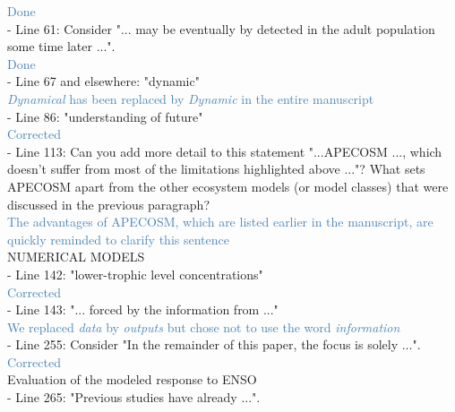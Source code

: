 \documentclass[12pt]{article}
\newcommand{\resp}[1]{\textcolor{SteelBlue}{#1}}
\begin{document}
\resp{Done}\\

- Line 61: Consider "... may be eventually by detected in the adult population some time later ...".\\

\resp{Done}   \\

- Line 67 and elsewhere: "dynamic"\\

\resp{\emph{Dynamical} has been replaced by \emph{Dynamic} in the entire manuscript} \\

- Line 86: "understanding of future" \\

\resp{Corrected} \\

- Line 113: Can you add more detail to this statement "...APECOSM ..., which doesn't suffer from most of the limitations highlighted above ..."? What sets APECOSM apart from the other ecosystem models (or model classes) that were discussed in the previous paragraph?\\

\resp{The advantages of APECOSM, which are listed earlier in the manuscript, are quickly reminded to clarify this sentence}\\

NUMERICAL MODELS\\

- Line 142: "lower-trophic level concentrations"\\

\resp{Corrected}\\

- Line 143: "... forced by the information from ..."\\

\resp{We replaced \emph{data} by \emph{outputs} but chose not to use the word \emph{information}}\\

- Line 255: Consider "In the remainder of this paper, the focus is solely ...".\\

\resp{Corrected}\\

Evaluation of the modeled response to ENSO\\

- Line 265: "Previous studies have already ...".\\
\end{document}
